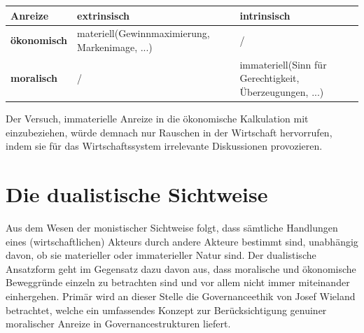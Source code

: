 \documentclass[12pt]{article}
\begin{document}
\begin{center}
\begin{tabular}{|p{3cm}|p{5cm}|p{5cm}|}
\hline
Anreize & \textbf{extrinsisch} & \textbf{intrinsisch}\\\hline
\textbf{ökonomisch} & materiell\newline(Gewinnmaximierung, Markenimage, ...) & /\\\hline
\textbf{moralisch} & / & immateriell\newline(Sinn für Gerechtigkeit, Überzeugungen, ...)\\\hline
\end{tabular}
\end{center}
Der Versuch, immaterielle Anreize in die ökonomische Kalkulation mit einzubeziehen, würde demnach nur Rauschen in der Wirtschaft hervorrufen, indem sie für das Wirtschaftssystem irrelevante Diskussionen provozieren.
\section{Die dualistische Sichtweise}
Aus dem Wesen der monistischer Sichtweise folgt, dass sämtliche Handlungen eines (wirtschaftlichen) Akteurs durch andere Akteure bestimmt sind, unabhängig davon, ob sie materieller oder immaterieller Natur sind. Der dualistische Ansatzform geht im Gegensatz dazu davon aus, dass moralische und ökonomische Beweggründe einzeln zu betrachten sind und vor allem nicht immer miteinander einhergehen. Primär wird an dieser Stelle die Governanceethik von Josef Wieland betrachtet, welche ein umfassendes Konzept zur Berücksichtigung genuiner moralischer Anreize in Governancestrukturen liefert.
\end{document}
